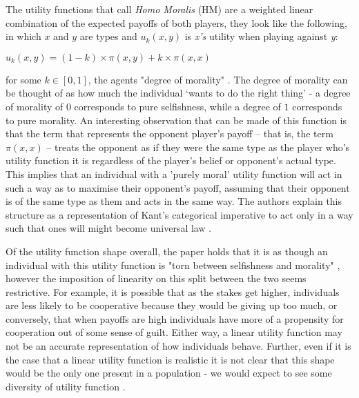 \documentclass[11pt]{article}
\newcommand*{\np}{\par\noindent\newline}
\begin{document}
\np The utility functions that \citet{alger_homo_2013} call \textit{Homo Moralis} (HM) are a weighted linear combination of the expected payoffs of both players, they look like the following, in which $x$ and $y$ are types and $u_k(x, y)$ is \textit{x's} utility when playing against \textit{y}:
\begin{center}
	$u_k(x, y) = (1 - k) \times \pi(x, y) + k \times \pi(x, x)$
\end{center}
for some $k \in [0, 1]$, the agents "degree of morality" \citep[~p 2274.]{alger_homo_2013}. The degree of morality can
be thought of as how much the individual `wants to do the right thing' - a degree of morality of $0$ corresponds to pure
selfishness, while a degree of $1$ corresponds to pure morality. An interesting observation that can be made of this
function is that the term that represents the opponent player's payoff -- that is, the term $\pi(x,x)$ -- treats the
opponent as if they were the same type as the player who's utility function it is regardless of the player's belief or opponent's actual type. This implies that an individual with a 'purely moral' utility function will act in such a way as to maximise their opponent's payoff, assuming that their opponent is of the same type as them and acts in the same way. The authors explain this structure as a representation of Kant's categorical imperative to act only in a way such that ones will might become universal law \citep{kant_groundwork_1775}.

\np Of the utility function shape overall, the paper holds that it is as though an individual with this utility function is "torn between selfishness and morality" \citep[~p. 2276]{alger_homo_2013}, however the imposition of linearity on this split between the two seems restrictive. For example, it is possible that as the stakes get higher, individuals are less likely to be cooperative because they would be giving up too much, or conversely, that when payoffs are high individuals have more of a propensity for cooperation out of some sense of guilt. Either way, a linear utility function may not be an accurate representation of how individuals behave. Further, even if it is the case that a linear utility function is realistic it is not clear that this shape would be the only one present in a population - we would expect to see some diversity of utility function \citep{van_veelen_why_2006}.
\end{document}
